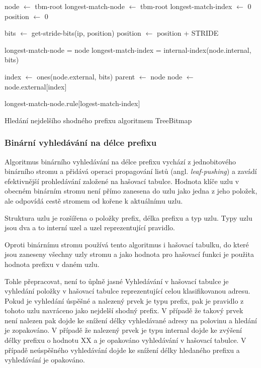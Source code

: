 \begin{algorithm}[H]
	node $\leftarrow$ tbm-root\;
	longest-match-node $\leftarrow$ tbm-root\;
	longest-match-index $\leftarrow$ 0\;
	position $\leftarrow$ 0\;
	{
		bits $\leftarrow$ get-stride-bits(ip, position)\;
		position $\leftarrow$ position + STRIDE\;


		{
			longest-match-node = node\;
			longest-match-index = internal-index(node.internal, bits)\;
		}

		index $\leftarrow$ ones(node.external, bits)\;
		parent $\leftarrow$ node\;
		node $\leftarrow$ node.external[index]\;
	}
	\Return longest-match-node.rule[logest-match-index]\;
	\caption{Hledání nejdelšího shodného prefixu algoritmem TreeBitmap}
    \label{alg:treebitmap}
\end{algorithm}

\subsubsection{Binární vyhledávání na délce prefixu} %

Algoritmus binárního vyhledávání na délce prefixu vychází z jednobitového binárního stromu a přidává
operaci propagování listů (angl. \textit{leaf-pushing}) a zavádí efektivnější prohledávání založené na hašovací
tabulce. Hodnota klíče uzlu v obecném binárním stromu není přímo zanesena do uzlu jako jedna z jeho položek,
ale odpovídá cestě stromem od kořene k aktuálnímu uzlu.

Struktura uzlu je rozšířena o položky prefix, délka prefixu a typ uzlu.
Typy uzlu jsou dva a to interní uzel a uzel reprezentující pravidlo.

Oproti binárnímu stromu používá tento algoritmus i hašovací tabulku, do které jsou zaneseny všechny uzly
stromu a jako hodnota pro hašovací funkci je použita hodnota prefixu v daném uzlu.

Tohle přepracovat, není to ůplně jasné %
Vyhledávání v hašovací tabulce je vyhledání položky v hašovací tabulce reprezentující celou klasifikovanou
adresu. Pokud je vyhledání úspěšné a nalezený prvek je typu prefix, pak je pravidlo z tohoto uzlu navráceno
jako nejdelší shodný prefix. V případě že takový prvek není nalezen pak dojde ke snížení délky vyhledávané
adresy na polovinu a hledání je zopakováno. V případě že nalezený prvek je typu internal dojde ke zvýšení
délky prefixu o hodnotu XX
a je opakováno vyhledávání v hašovací tabulce. V případě neúspěšného vyhledávání dojde ke snížení délky hledaného prefixu a vyhledávání je opakováno.

